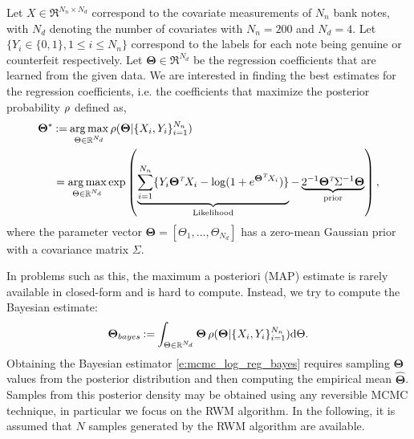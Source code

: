 Let $X \in \Re^{N_n \times N_d}$ correspond to the covariate measurements of $N_n$ bank notes, with $N_d$ denoting the number of covariates with $N_n = 200$ and $N_d = 4$. Let $\{Y_i  \in \{0,1\}, 1 \leq i \leq N_n \}$ correspond to the labels for each note being genuine or counterfeit respectively. Let $\boldsymbol{\Theta} \in \Re^{N_d}$ be the regression coefficients that are learned from the given data. We are interested in finding the best estimates for the regression coefficients, i.e. the coefficients that maximize the posterior probability $\rho$ defined as,
\begin{equation}
\begin{aligned}
\boldsymbol{\Theta}^* &\eqdef  \argmax_{\Theta \in \Re^{N_d}} \pr(\boldsymbol{\Theta}| \{X_i,Y_i\}_{i=1}^{N_n}) \\
&= \argmax_{\Theta \in \Re^{N_d} }\exp\left( \underbrace{\sum_{i=1}^{N_n} \{Y_i \boldsymbol{\Theta}^\transpose X_i - \log(1+e^{\boldsymbol{\Theta}^\transpose X_i} ) \}}_{\text{Likelihood}} - \underbrace{2^{-1} \boldsymbol{\Theta}^\transpose \Sigma^{-1} \boldsymbol{\Theta}}_{\text{prior}} \right),
\end{aligned}
\label{e:mcmc_log_reg}
\end{equation}
where the parameter vector $\boldsymbol{\Theta} = [ \Theta_1, \dots ,\Theta_{N_d}]$ has a zero-mean Gaussian prior with a covariance matrix $\Sigma$.

In problems such as this, the maximum a posteriori (MAP) estimate is rarely available in closed-form and is hard to compute. Instead, we try to compute the Bayesian estimate: 
\begin{equation}
\boldsymbol{\Theta}_{{bayes}} \eqdef \int_{\Theta \in \Re^{N_d}} \boldsymbol{\Theta} \, \pr(\boldsymbol{\Theta}| \{X_i,Y_i\}_{i=1}^{N_n}) \ud \Theta.
\label{e:mcmc_log_reg_bayes}
\end{equation}
Obtaining the Bayesian estimator \eqref{e:mcmc_log_reg_bayes} requires sampling $\boldsymbol{\Theta}$ values from the posterior distribution and then computing the empirical mean $\hat{\boldsymbol{\Theta}}$. Samples from this posterior density may be obtained using any reversible MCMC technique, in particular we focus on the RWM algorithm. In the following, it is assumed that $N$ samples generated by the RWM algorithm are available.

